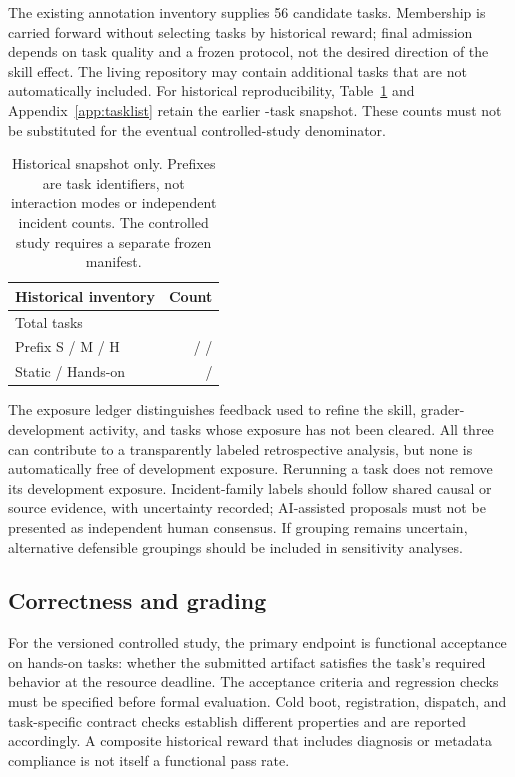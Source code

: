 \documentclass[11pt]{article}
\begin{document}
The existing annotation inventory supplies 56 candidate tasks.
Membership is carried forward without selecting tasks by historical reward; final admission depends on task quality and a frozen protocol, not the desired direction of the skill effect.
The living repository may contain additional tasks that are not automatically included.
For historical reproducibility, Table~\ref{tab:tasks} and Appendix~\ref{app:tasklist} retain the earlier \BenchmarkTaskCount{}-task snapshot.
These counts must not be substituted for the eventual controlled-study denominator.

\begin{table}[t]
\centering
\begin{tabular}{lr}
\hline
Historical inventory & Count\\
\hline
Total tasks & \BenchmarkTaskCount{}\\
Prefix S / M / H & \BenchmarkPrefixSCount{} / \BenchmarkPrefixMCount{} / \BenchmarkPrefixHCount{}\\
Static / Hands-on & \BenchmarkStaticCount{} / \BenchmarkHandsOnCount{}\\
\hline
\end{tabular}
\caption{Historical snapshot only. Prefixes are task identifiers, not interaction modes or independent incident counts. The controlled study requires a separate frozen manifest.}
\label{tab:tasks}
\end{table}

The exposure ledger distinguishes feedback used to refine the skill, grader-development activity, and tasks whose exposure has not been cleared.
All three can contribute to a transparently labeled retrospective analysis, but none is automatically free of development exposure.
Rerunning a task does not remove its development exposure.
Incident-family labels should follow shared causal or source evidence, with uncertainty recorded; AI-assisted proposals must not be presented as independent human consensus.
If grouping remains uncertain, alternative defensible groupings should be included in sensitivity analyses.

\subsection{Correctness and grading}
\label{sec:grading}

For the versioned controlled study, the primary endpoint is functional acceptance on hands-on tasks: whether the submitted artifact satisfies the task's required behavior at the resource deadline.
The acceptance criteria and regression checks must be specified before formal evaluation.
Cold boot, registration, dispatch, and task-specific contract checks establish different properties and are reported accordingly.
A composite historical reward that includes diagnosis or metadata compliance is not itself a functional pass rate.
\end{document}
